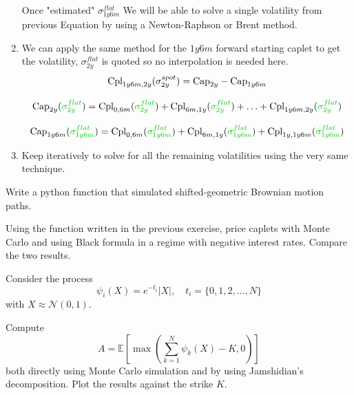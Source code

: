\documentclass[12pt,a4paper]{book}
\begin{document}
\begin{solution}
\begin{enumerate}
Once "estimated" $\sigma^{flat}_{1y6m}$ We will be able to solve a single volatility from previous Equation by using a Newton-Raphson or Brent method.

\item We can apply the same method for the $1y6m$ forward starting caplet to get the volatility, $\sigma^{flat}_{2y}$ is quoted so no interpolation is needed here.
\begin{equation}
\begin{gathered}
\text{Cpl}_{1y6m, 2y}(\sigma^{spot}_{2y})= \text{Cap}_{2y}-\text{Cap}_{1y6m} \\[0.3cm]
\text{Cap}_{2y}(\textcolor{ipython-green}{\sigma^{flat}_{2y}})=\text{Cpl}_{0,6m}(\textcolor{ipython-green}{\sigma^{flat}_{2y}}) + \text{Cpl}_{6m,1y}(\textcolor{ipython-green}{\sigma^{flat}_{2y}}) + \ldots + \text{Cpl}_{1y6m,2y}(\textcolor{ipython-green}{\sigma^{flat}_{2y}}) \\[0.3cm]
\text{Cap}_{1y6m}(\textcolor{ipython-green}{\sigma^{flat}_{1y6m}})=\text{Cpl}_{0,6m}(\textcolor{ipython-green}{\sigma^{flat}_{1y6m}}) + \text{Cpl}_{6m,1y}(\textcolor{ipython-green}{\sigma^{flat}_{1y6m}}) + \text{Cpl}_{1y,1y6m}(\textcolor{ipython-green}{\sigma^{flat}_{1y6m}})
\end{gathered}
\end{equation}

\item Keep iteratively to solve for all the remaining volatilities using the very same technique.
\end{enumerate}
\end{solution}

\begin{question}[subtitle=Shifted Brownian Motion (\texttt{python})]
Write a python function that simulated shifted-geometric Brownian motion paths.
\end{question}

\begin{question}[subtitle=Negative Rates (\texttt{python})]
Using the function written in the previous exercise, price caplets with Monte Carlo and using Black formula in a regime with negative interest rates. Compare the two results.
\end{question}

\begin{question}[subtitle=Jamshidian Trick (\texttt{python})]
Consider the process 
\begin{equation*}
\psi_i(X)=e^{-t_i}|X|,\quad t_i=\{0,1,2,\ldots, N\}
\end{equation*}
with $X\approx\mathcal{N}(0,1)$.

Compute 
\begin{equation*}
A = \mathbb{E}\left[\max\left(\sum_{k=1}^N \psi_k(X) - K, 0\right)\right]
\end{equation*}
both directly using Monte Carlo simulation and by using Jamshidian's decomposition.
Plot the results against the strike $K$.
\end{question}
\end{document}
